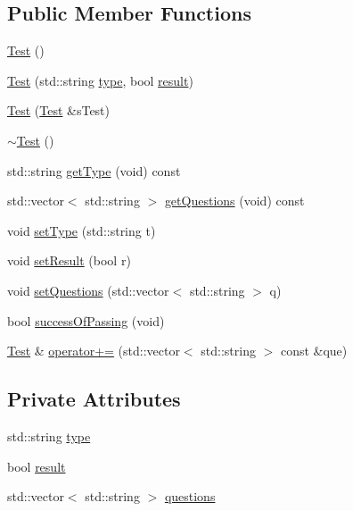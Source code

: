 \subsection*{Public Member Functions}
\begin{DoxyCompactItemize}
\item 
\hyperlink{class_test_a99f2bbfac6c95612322b0f10e607ebe5}{Test} ()
\item 
\hyperlink{class_test_a4b20375118c81a6a0bddbe98f1de464e}{Test} (std\+::string \hyperlink{class_test_a62aead72f049c0462c5b45d5a48b296f}{type}, bool \hyperlink{class_test_a00ac92c896939892dd9e28a5b4b3e5b7}{result})
\item 
\hyperlink{class_test_af5be817bd4d65673ab553c7a9d9ddaa8}{Test} (\hyperlink{class_test}{Test} \&s\+Test)
\item 
\hyperlink{class_test_a2b0a62f1e667bbe8d8cb18d785bfa991}{$\sim$\+Test} ()
\item 
std\+::string \hyperlink{class_test_ae550830721b9cfff6b9251d9b96bd99e}{get\+Type} (void) const
\item 
std\+::vector$<$ std\+::string $>$ \hyperlink{class_test_ac4d3f0b5a8786de3713e93e46c8b2f97}{get\+Questions} (void) const
\item 
void \hyperlink{class_test_a54f6a794a60c3173b67da6f0f2c13b0a}{set\+Type} (std\+::string t)
\item 
void \hyperlink{class_test_ac921aece347e57beb4efd8e10a98a2e2}{set\+Result} (bool r)
\item 
void \hyperlink{class_test_a114815379828a59a1d3a4ac1750f99bd}{set\+Questions} (std\+::vector$<$ std\+::string $>$ q)
\item 
bool \hyperlink{class_test_aafa54c39027462096d9c65c84bf9e976}{success\+Of\+Passing} (void)
\item 
\hyperlink{class_test}{Test} \& \hyperlink{class_test_abda6e061511f23c4dfc47b6083ea5fef}{operator+=} (std\+::vector$<$ std\+::string $>$ const \&que)
\end{DoxyCompactItemize}
\subsection*{Private Attributes}
\begin{DoxyCompactItemize}
\item 
std\+::string \hyperlink{class_test_a62aead72f049c0462c5b45d5a48b296f}{type}
\item 
bool \hyperlink{class_test_a00ac92c896939892dd9e28a5b4b3e5b7}{result}
\item 
std\+::vector$<$ std\+::string $>$ \hyperlink{class_test_a44f8c50d1aa570514abcfcd0663f3df2}{questions}
\end{DoxyCompactItemize}
